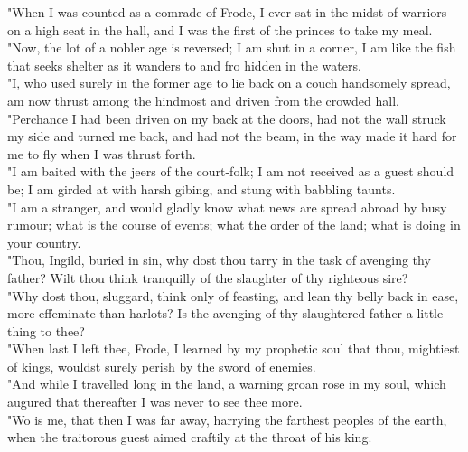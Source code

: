 \documentclass[10pt,a4paper]{report}
\begin{document}
"When I was counted as a comrade of Frode, I ever sat in the midst of warriors on a high seat in the hall, and I was the first of the princes to take my meal.\\

"Now, the lot of a nobler age is reversed; I am shut in a corner, I am like the fish that seeks shelter as it wanders to and fro hidden in the waters.\\

"I, who used surely in the former age to lie back on a couch handsomely spread, am now thrust among the hindmost and driven from the crowded hall.\\

"Perchance I had been driven on my back at the doors, had not the wall struck my side and turned me back, and had not the beam, in the way made it hard for me to fly when I was thrust forth.\\

"I am baited with the jeers of the court-folk; I am not received as a guest should be; I am girded at with harsh gibing, and stung with babbling taunts.\\

"I am a stranger, and would gladly know what news are spread abroad by busy rumour; what is the course of events; what the order of the land; what is doing in your country.\\

"Thou, Ingild, buried in sin, why dost thou tarry in the task of avenging thy father? Wilt thou think tranquilly of the slaughter of thy righteous sire?\\

"Why dost thou, sluggard, think only of feasting, and lean thy belly back in ease, more effeminate than harlots? Is the avenging of thy slaughtered father a little thing to thee?\\

"When last I left thee, Frode, I learned by my prophetic soul that thou, mightiest of kings, wouldst surely perish by the sword of enemies.\\

"And while I travelled long in the land, a warning groan rose in my soul, which augured that thereafter I was never to see thee more.\\

"Wo is me, that then I was far away, harrying the farthest peoples of the earth, when the traitorous guest aimed craftily at the throat of his king.\\
\end{document}

